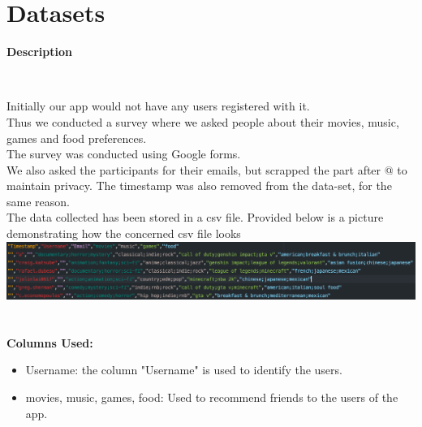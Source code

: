 \documentclass[11pt]{report}
\begin{document}

\chapter{Datasets}


{\bf Description}

~

Initially our app would not have any users registered with it.\\ 

Thus we conducted a survey where we asked people about their movies, music, games and food preferences.\\
The survey was conducted using Google forms. \\

We also asked the participants for their emails, but scrapped the part after @ to maintain privacy. The timestamp was also removed from the data-set, for the same reason. \\

The data collected has been stored in a csv file. Provided below is a picture demonstrating how the concerned csv file looks \\

\includegraphics[scale = .4]{Images/data.png}~\\\\

{\bf Columns Used:}

\begin{itemize}
    \item Username: the column "Username" is used to identify the users.
    
    \item movies, music, games, food: Used to recommend friends to the users of the app.
\end{itemize}


\newpage 




\end{document}
